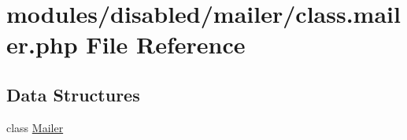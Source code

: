\hypertarget{class_8mailer_8php}{\section{modules/disabled/mailer/class.mailer.\-php File Reference}
\label{class_8mailer_8php}
}
\subsection*{Data Structures}
\begin{DoxyCompactItemize}
\item 
class \hyperlink{class_mailer}{Mailer}
\end{DoxyCompactItemize}
